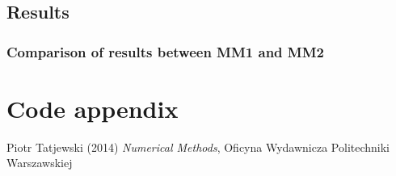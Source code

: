 \documentclass[12pt]{report}
\begin{document}
\section{Results}
\subsection{Comparison of results between MM1 and MM2}

\chapter{Code appendix}

\begin{thebibliography}{9}
Piotr Tatjewski (2014) \emph{Numerical Methods}, Oficyna Wydawnicza Politechniki Warszawskiej
\end{thebibliography}
\end{document}
